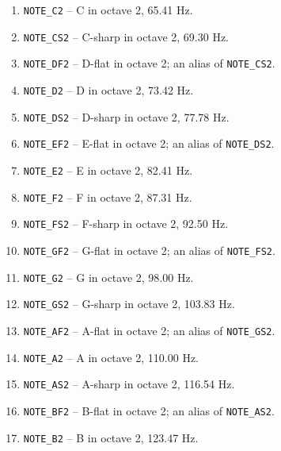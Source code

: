 \begin{enumerate}
    \item \texttt{NOTE\_C2} -- C in octave 2, 65.41 Hz.
    \item \texttt{NOTE\_CS2} -- C-sharp in octave 2, 69.30 Hz.
    \item \texttt{NOTE\_DF2} -- D-flat in octave 2; an alias of \texttt{NOTE\_CS2}.
    \item \texttt{NOTE\_D2} -- D in octave 2, 73.42 Hz.
    \item \texttt{NOTE\_DS2} -- D-sharp in octave 2, 77.78 Hz.
    \item \texttt{NOTE\_EF2} -- E-flat in octave 2; an alias of \texttt{NOTE\_DS2}.
    \item \texttt{NOTE\_E2} -- E in octave 2, 82.41 Hz.
    \item \texttt{NOTE\_F2} -- F in octave 2, 87.31 Hz.
    \item \texttt{NOTE\_FS2} -- F-sharp in octave 2, 92.50 Hz.
    \item \texttt{NOTE\_GF2} -- G-flat in octave 2; an alias of \texttt{NOTE\_FS2}.
    \item \texttt{NOTE\_G2} -- G in octave 2, 98.00 Hz.
    \item \texttt{NOTE\_GS2} -- G-sharp in octave 2, 103.83 Hz.
    \item \texttt{NOTE\_AF2} -- A-flat in octave 2; an alias of \texttt{NOTE\_GS2}.
    \item \texttt{NOTE\_A2} -- A in octave 2, 110.00 Hz.
    \item \texttt{NOTE\_AS2} -- A-sharp in octave 2, 116.54 Hz.
    \item \texttt{NOTE\_BF2} -- B-flat in octave 2; an alias of \texttt{NOTE\_AS2}.
    \item \texttt{NOTE\_B2} -- B in octave 2, 123.47 Hz.


\end{enumerate}

